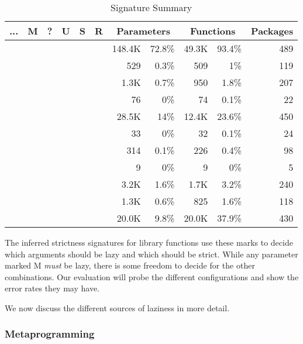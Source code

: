 \documentclass[review,creen,acmsmall]{acmart}
\newcommand{\xmark}{\textcolor{red}{\ding{55}}}
\newcommand{\cmark}{\textcolor{green}{\ding{51}}}
\newcommand{\rmark}{\textcolor{blue}{\ding{108}}}
\begin{document}
\begin{table}
  \vspace{-3mm}
  \small
  \caption{Signature Summary} \label{table:strictdist}
  \centering
  \begin{tabular}{ccccccrrrrr}
    \toprule
    \bf ... & \bf M & \bf ? & \bf U & \bf S & \bf R & \multicolumn{2}{c}{\textbf{Parameters}} & \multicolumn{2}{c}{\textbf{Functions}}& \bf Packages\\
    \midrule
    \xmark{}&\xmark{}&\xmark{}&\xmark{}&\xmark{}&\xmark{}&148.4K&72.8\%&49.3K&93.4\%&489\\
    \xmark{}&\xmark{}&\xmark{}&\xmark{}&\xmark{}&\cmark{}&529&0.3\%&509&1\%&119\\
    \xmark{}&\xmark{}&\xmark{}&\xmark{}&\cmark{}&\xmark{}&1.3K&0.7\%&950&1.8\%&207\\
    \xmark{}&\xmark{}&\xmark{}&\xmark{}&\cmark{}&\cmark{}&76&0\%&74&0.1\%&22\\
    \xmark{}&\xmark{}&\xmark{}&\cmark{}&\xmark{}&\xmark{}&28.5K&14\%&12.4K&23.6\%&450\\
    \xmark{}&\xmark{}&\xmark{}&\cmark{}&\xmark{}&\cmark{}&33&0\%&32&0.1\%&24\\
    \xmark{}&\xmark{}&\xmark{}&\cmark{}&\cmark{}&\xmark{}&314&0.1\%&226&0.4\%&98\\
    \xmark{}&\xmark{}&\xmark{}&\cmark{}&\cmark{}&\cmark{}&9&0\%&9&0\%&5\\
    \rmark{}&\rmark{}&\cmark{}&\rmark{}&\rmark{}&\rmark{}&3.2K&1.6\%&1.7K&3.2\%&240\\
    \rmark{}&\cmark{}&\rmark{}&\rmark{}&\rmark{}&\rmark{}&1.3K&0.6\%&825&1.6\%&118\\
    \cmark{}&\rmark{}&\rmark{}&\rmark{}&\rmark{}&\rmark{}&20.0K&9.8\%&20.0K&37.9\%&430\\
    \bottomrule
  \end{tabular}
\end{table}


The inferred strictness signatures for library functions use these marks to
decide which arguments should be lazy and which should be strict. While any
parameter marked M \emph{must} be lazy, there is some freedom to decide for the
other combinations. Our evaluation will probe the different configurations and
show the error rates they may have.

\medskip

We now discuss the different sources of laziness in more detail.


\subsubsection{Metaprogramming}
\end{document}
